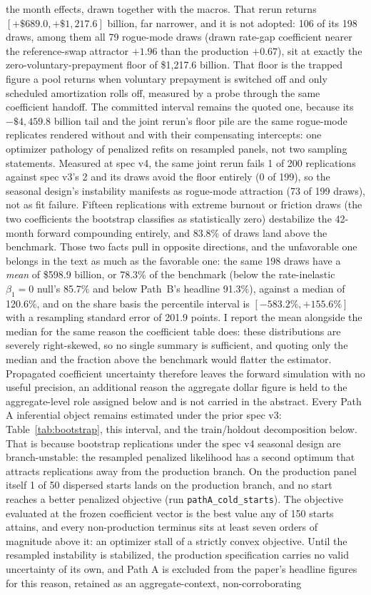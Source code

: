 \documentclass[12pt]{article}
\begin{document}
the month effects, drawn together with the macros. That rerun returns $[+\$689.0, +\$1{,}217.6]$ billion, far narrower, and it is not adopted: 106 of its 198 draws, among them all 79 rogue-mode draws (drawn rate-gap coefficient nearer the reference-swap attractor $+1.96$ than the production $+0.67$), sit at exactly the zero-voluntary-prepayment floor of \$1{,}217.6 billion. That floor is the trapped figure a pool returns when voluntary prepayment is switched off and only scheduled amortization rolls off, measured by a probe through the same coefficient handoff. The committed interval remains the quoted one, because its $-\$4{,}459.8$ billion tail and the joint rerun's floor pile are the same rogue-mode replicates rendered without and with their compensating intercepts: one optimizer pathology of penalized refits on resampled panels, not two sampling statements. Measured at spec v4, the same joint rerun fails 1 of 200 replications against spec v3's 2 and its draws avoid the floor entirely (0 of 199), so the seasonal design's instability manifests as rogue-mode attraction (73 of 199 draws), not as fit failure. Fifteen replications with extreme burnout or friction draws (the two coefficients the bootstrap classifies as statistically zero) destabilize the 42-month forward compounding entirely, and 83.8\% of draws land above the benchmark. Those two facts pull in opposite directions, and the unfavorable one belongs in the text as much as the favorable one: the same 198 draws have a \emph{mean} of \$598.9 billion, or 78.3\% of the benchmark (below the rate-inelastic $\beta_1 = 0$ null's 85.7\% and below Path~B's headline 91.3\%), against a median of 120.6\%, and on the share basis the percentile interval is $[-583.2\%, +155.6\%]$ with a resampling standard error of 201.9 points. I report the mean alongside the median for the same reason the coefficient table does: these distributions are severely right-skewed, so no single summary is sufficient, and quoting only the median and the fraction above the benchmark would flatter the estimator. Propagated coefficient uncertainty therefore leaves the forward simulation with no useful precision, an additional reason the aggregate dollar figure is held to the aggregate-level role assigned below and is not carried in the abstract. Every Path A inferential object remains estimated under the prior spec v3: Table~\ref{tab:bootstrap}, this interval, and the train/holdout decomposition below. That is because bootstrap replications under the spec v4 seasonal design are branch-unstable: the resampled penalized likelihood has a second optimum that attracts replications away from the production branch. On the production panel itself 1 of 50 dispersed starts lands on the production branch, and no start reaches a better penalized objective (run \texttt{pathA\_cold\_starts}). The objective evaluated at the frozen coefficient vector is the best value any of 150 starts attains, and every non-production terminus sits at least seven orders of magnitude above it: an optimizer stall of a strictly convex objective. Until the resampled instability is stabilized, the production specification carries no valid uncertainty of its own, and Path A is excluded from the paper's headline figures for this reason, retained as an aggregate-context, non-corroborating 
\end{document}
